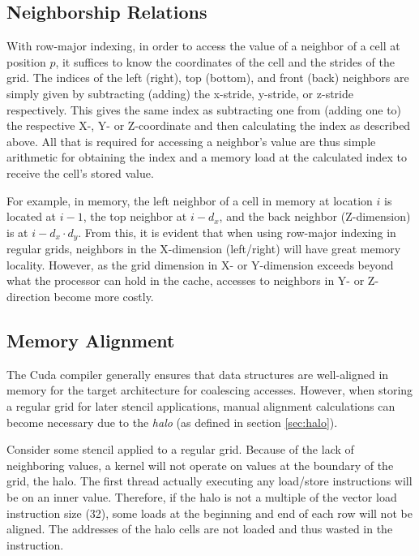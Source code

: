 \subsection{Neighborship Relations}

With row-major indexing, in order to access the value of a neighbor of a cell at position $p$, it suffices to know the coordinates of the cell and the strides of the grid. The indices of the left (right), top (bottom), and front (back) neighbors are simply given by subtracting (adding) the x-stride, y-stride, or z-stride respectively. This gives the same index as subtracting one from (adding one to) the respective X-, Y- or Z-coordinate and then calculating the index as described above. All that is required for accessing a neighbor's value are thus simple arithmetic for obtaining the index and a memory load at the calculated index to receive the cell's stored value.

For example, in memory, the left neighbor of a cell in memory at location $i$ is located at $i-1$, the top neighbor at $i-d_x$, and the back neighbor (Z-dimension) is at $i - d_x\cdot d_y$. From this, it is evident that when using row-major indexing in regular grids, neighbors in the X-dimension (left/right) will have great memory locality. However, as the grid dimension in X- or Y-dimension exceeds beyond what the processor can hold in the cache, accesses to neighbors in Y- or Z-direction become more costly. 

\subsection{Memory Alignment}

\label{sec:regular-memory-alignment}
The Cuda compiler generally ensures that data structures are well-aligned in memory for the target architecture for coalescing accesses. However, when storing a regular grid for later stencil applications, manual alignment calculations can become necessary due to the \emph{halo} (as defined in section \ref{sec:halo}). 

Consider some stencil applied to a regular grid. Because of the lack of neighboring values, a kernel will not operate on values at the boundary of the grid, the halo. The first thread actually executing any load/store instructions will be on an inner value. Therefore, if the halo is not a multiple of the vector load instruction size (32), some loads at the beginning and end of each row will not be aligned. The addresses of the halo cells are not loaded and thus wasted in the instruction.

